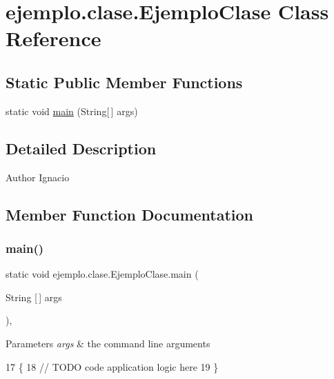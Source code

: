 \hypertarget{classejemplo_1_1clase_1_1_ejemplo_clase}{}\section{ejemplo.\+clase.\+Ejemplo\+Clase Class Reference}
\label{classejemplo_1_1clase_1_1_ejemplo_clase}
\subsection*{Static Public Member Functions}
\begin{DoxyCompactItemize}
\item 
static void \mbox{\hyperlink{classejemplo_1_1clase_1_1_ejemplo_clase_a9daf2fa777db03fb4c1682b83ba20a6e}{main}} (String\mbox{[}$\,$\mbox{]} args)
\end{DoxyCompactItemize}


\subsection{Detailed Description}
\begin{DoxyAuthor}{Author}
Ignacio 
\end{DoxyAuthor}


\subsection{Member Function Documentation}
\mbox{\label{classejemplo_1_1clase_1_1_ejemplo_clase_a9daf2fa777db03fb4c1682b83ba20a6e}} 
\subsubsection{\texorpdfstring{main()}{main()}}
{\footnotesize\ttfamily static void ejemplo.\+clase.\+Ejemplo\+Clase.\+main (\begin{DoxyParamCaption}\item[{String \mbox{[}$\,$\mbox{]}}]{args }\end{DoxyParamCaption})\hspace{0.3cm}{\ttfamily [inline]}, {\ttfamily [static]}}


\begin{DoxyParams}{Parameters}
{\em args} & the command line arguments \\
\hline
\end{DoxyParams}

\begin{DoxyCode}
17                                            \{
18         \textcolor{comment}{// TODO code application logic here}
19     \}
\end{DoxyCode}
